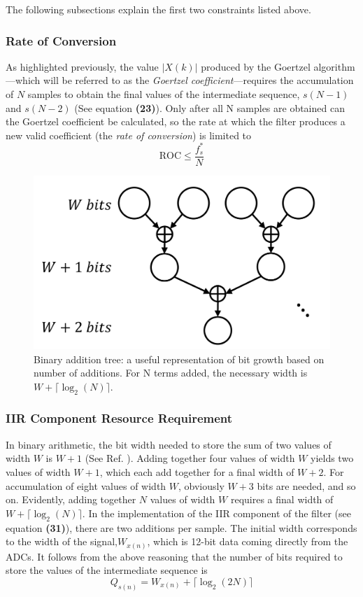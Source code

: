 \documentclass[reprint,amsmath,amssymb,aps,pra]{revtex4-2}
\begin{document}
The following subsections explain the first two constraints listed above.

\subsubsection{Rate of Conversion}

As highlighted previously, the value $|X(k)|$ produced by the Goertzel algorithm---which will be referred to as the \textit{Goertzel coefficient}---requires the accumulation of $N$ samples to obtain the final values of the intermediate sequence, $s(N-1)$ and $s(N-2)$ (See equation \textbf{(23)}). Only after all N samples are obtained can the Goertzel coefficient be calculated, so the rate at which the filter produces a new valid coefficient (the \textit{rate of conversion}) is limited to
\begin{equation}
    \text{ROC} \leq  \frac{f_s^*}{N} 
\end{equation}

\begin{figure}
    \centering
    \includegraphics[width=0.8\linewidth]{figs/binary_addition_tree.png}
    \caption{Binary addition tree: a useful representation of bit growth based on number of additions. For N terms added, the necessary width is $W + \lceil\log_2(N)\rceil$.}
    \label{fig:addtree}
\end{figure}

\subsubsection{IIR Component Resource Requirement}

In binary arithmetic, the bit width needed to store the sum of two values of width $W$ is $W+1$ (See Ref. \cite{fixed-point}). Adding together four values of width $W$ yields two values of width $W+1$, which each add together for a final width of $W+2$. For accumulation of eight values of width $W$, obviously $W+3$ bits are needed, and so on. Evidently, adding together $N$ values of width $W$ requires a final width of $W + \lceil\log_2(N)\rceil$. In the implementation of the IIR component of the filter (see equation \textbf{(31)}), there are two additions per sample. The initial width corresponds to the width of the signal,$W_{x(n)}$, which is 12-bit data coming directly from the ADCs. It follows from the above reasoning that the number of bits required to store the values of the intermediate sequence is
\begin{equation}
    Q_{s(n)} = W_{x(n)} + \lceil\log_2(2N)\rceil
\end{equation}
\end{document}
